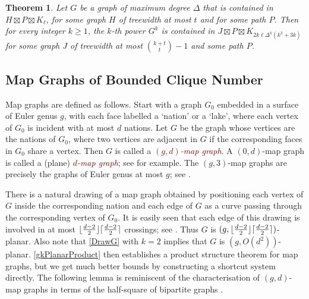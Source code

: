 \documentclass{patmorin}
\theoremstyle{plain}
\newtheorem{thm}{Theorem}
\theoremstyle{definition}
\newcommand{\defin}[1]{\textcolor{Maroon}{\emph{#1}}}
\newcommand{\note}[2]{\noindent{\color{red}[#1:~#2]}}
\DeclarePairedDelimiter{\ceil}{\lceil}{\rceil}
\DeclarePairedDelimiter{\floor}{\lfloor}{\rfloor}
\renewcommand{\geq}{\geqslant}
\begin{document}
\begin{thm}
\label{PowerProduct}
Let $G$ be a graph of maximum degree $\Delta$ that is contained in $H\boxtimes P\boxtimes K_\ell$, for some graph $H$ of treewidth at most $t$ and for some path $P$. Then for every integer $k\geq 1$, the $k$-th power $G^k$ is contained in $J\boxtimes P\boxtimes K_{2k \ell \Delta^{k}(k^3+3k)}$ for some graph $J$ of treewidth at most $\binom{k+t}{t}-1$ and some path $P$.
\end{thm}

\subsection{Map Graphs of Bounded Clique Number}

\note{PM}{To make the referee happy I've added the ``bounded-degree'' qualifier to string graphs and the ``bounded clique number'' qualifier to map graphs.  Do we want to explcitly state that the clique number of a $(g,d)$-map graph is bounded by a function of $g$ and $d$?  Proof (for the $g=0$ case): A $d$-map representation gives a drawing with at most $\floor{\tfrac{d-2}{2}}\ceil{\tfrac{d-2}{2}}\in O(d^2)$ crossings per edge, but any drawing of $K_{\omega}$ on a surface of genus-$g$ has an edge that is crossed $\Omega(\omega^2)$ times. So if $G$ is a $d$-map graph then $\omega(G) \in O(d)$.}

Map graphs are defined as follows. Start with a graph $G_0$ embedded in a surface of Euler genus $g$, with each face labelled a `nation' or a `lake', where each vertex of $G_0$ is incident with at most $d$ nations. Let $G$ be the graph whose vertices are the nations of $G_0$, where two vertices are adjacent in $G$ if the corresponding faces in $G_0$ share a vertex. Then $G$ is called a \defin{$(g,d)$-map graph}.  A $(0,d)$-map graph is called a (plane) \defin{$d$-map graph}; see \citep{FLS-SODA12,CGP02} for example. The $(g,3)$-map graphs are precisely the graphs of Euler genus at most $g$; see \citep{dujmovic.eppstein.ea:structure}.

There is a natural drawing of a map graph obtained by positioning each vertex of $G$ inside the corresponding nation and each edge of $G$ as a curve passing through the corresponding vertex of $G_0$. It is easily seen that each edge of this drawing is involved in at most $\floor{\frac{d-2}{2}}\ceil{\frac{d-2}{2}}$ crossings; see \citep{dujmovic.eppstein.ea:structure}. Thus $G$ is $(g,\floor{\frac{d-2}{2}}\ceil{\frac{d-2}{2}})$-planar. Also note that \cref{DrawG} with $k=2$ implies that $G$ is $(g, O(d^{2}) )$-planar. \cref{gkPlanarProduct} then establishes a product structure theorem for map graphs, but we get much better bounds by constructing a shortcut system directly.  The following lemma is reminiscent of the characterisation of $(g,d)$-map graphs in terms of the half-square of bipartite graphs \citep{CGP02,dujmovic.eppstein.ea:structure}.
\end{document}
